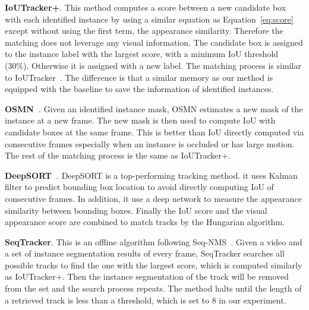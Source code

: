 \noindent\textbf{IoUTracker+}. This method computes a score between a new candidate box with each identified instance by using a similar equation as Equation~\ref{eq:score} except without using the first term, \ie the appearance similarity. Therefore the matching does not leverage any visual information. The candidate box is assigned to the instance label with the largest score, with a minimum IoU threshold (30\%). Otherwise it is assigned with a new label. The matching process is similar to IoUTracker~\cite{bochinski2017high}. The difference is that a similar memory as our method is equipped with the baseline to save the information of identified instances. 

\noindent\textbf{OSMN~\cite{Yang2018osmn}}. Given an identified instance mask, OSMN estimates a new mask of the instance at a new frame. The new mask is then used to compute IoU with candidate boxes at the same frame. This is better than IoU directly computed via consecutive frames especially when an instance is occluded or has large motion. The rest of the matching process is the same as IoUTracker+.

\noindent\textbf{DeepSORT~\cite{wojke2017simple}}. DeepSORT is a top-performing tracking method. it uses Kalman filter to predict bounding box location to avoid directly computing IoU of consecutive frames. In addition, it use a deep network to measure the appearance similarity between bounding boxes. Finally the IoU score and the visual appearance score are combined to match tracks by the Hungarian algorithm.

\noindent\textbf{SeqTracker}. This is an offline algorithm following Seq-NMS~\cite{seqnms16}. Given a video and a set of instance segmentation results of every frame, SeqTracker searches all possible tracks to find the one with the largest score, which is computed similarly as IoUTracker+. Then the instance segmentation of the track will be removed from the set and the search process repeats. The method halts until the length of a retrieved track is less than a threshold, which is set to 8 in our experiment. 











